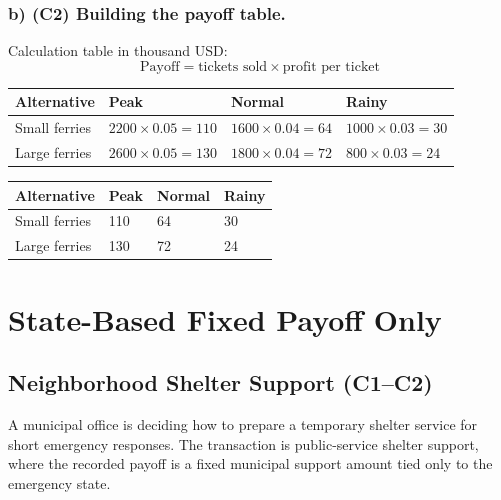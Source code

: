 	
	\subsubsection*{b) \textbf{(C2)} Building the payoff table.}
	\label{subsec:problem7-lake-ferry-tourism-c2}
	Calculation table in thousand USD:
	\[
	\text{Payoff}=\text{tickets sold}\times\text{profit per ticket}
	\]
	\begin{center}
		\begin{tabular}{llll}
			\toprule
			Alternative & Peak & Normal & Rainy \\
			\midrule
			Small ferries & $2200 \times 0.05 = 110$ & $1600 \times 0.04 = 64$ & $1000 \times 0.03 = 30$ \\
			Large ferries & $2600 \times 0.05 = 130$ & $1800 \times 0.04 = 72$ & $800 \times 0.03 = 24$ \\
			\bottomrule
		\end{tabular}
	\end{center}
	
	\begin{center}
		\begin{tabular}{llll}
			\toprule
			Alternative & Peak & Normal & Rainy \\
			\midrule
			Small ferries & 110 & 64 & 30 \\
			Large ferries & 130 & 72 & 24 \\
			\bottomrule
		\end{tabular}
	\end{center}
	
	
	\section{State-Based Fixed Payoff Only}
	\label{sec:state-based-fixed-payoff-only}
	
	
	\subsection{Neighborhood Shelter Support (C1--C2)}
	\label{sec:problem15-neighborhood-shelter-support-c1-c2}
	A municipal office is deciding how to prepare a temporary shelter service for short emergency responses. The transaction is public-service shelter support, where the recorded payoff is a fixed municipal support amount tied only to the emergency state.
	
